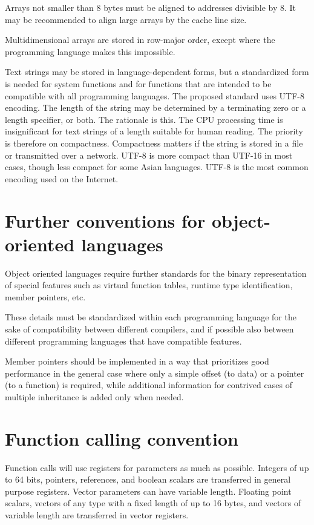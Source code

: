 \documentclass[forwardcom.tex]{subfiles}
\begin{document}
Arrays not smaller than 8 bytes must be aligned to addresses divisible by 8. It may be recommended to align large arrays by the cache line size. 
\vspace{2mm}

Multidimensional arrays are stored in row-major order, except where the programming language makes this impossible. 
\vspace{2mm}

Text strings may be stored in language-dependent forms, but a standardized form is needed for system functions and for functions that are intended to be compatible with all programming languages. The proposed standard uses UTF-8 encoding. The length of the string may be determined by a terminating zero or a length specifier, or both.
The rationale is this. The CPU processing time is insignificant for text strings of a length suitable for human reading. The priority is therefore on compactness. Compactness matters if the string is stored in a file or transmitted over a network. UTF-8 is more compact than UTF-16 in most cases, though less compact for some Asian languages. UTF-8 is the most common encoding used on the Internet.

\section{Further conventions for object-oriented languages}
Object oriented languages require further standards for the binary representation of special features such as virtual function tables, runtime type identification, member pointers, etc. 
\vspace{2mm}

These details must be standardized within each programming language for the sake of compatibility between different compilers, and if possible also between different programming languages that have compatible features. 
\vspace{2mm}

Member pointers should be implemented in a way that prioritizes good performance in the general case where only a simple offset (to data) or a pointer (to a function) is required, while additional information for contrived cases of multiple inheritance is added only when needed. 

\section{Function calling convention}\label{chap:functionCallingConventions}
Function calls will use registers for parameters as much as possible. Integers of up to 64 bits, pointers, references, and boolean scalars are transferred in general purpose registers. Vector parameters can have variable length. Floating point scalars, vectors of any type with a fixed length of up to 16 bytes, and vectors of variable length are transferred in vector registers. 
\vspace{2mm}
\end{document}

